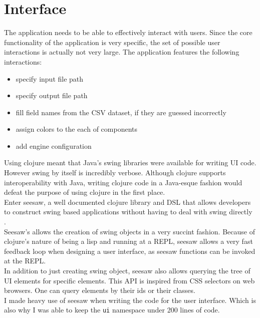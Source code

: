 \section{Interface}


The application needs to be able to effectively interact with users. Since the core functionality of the application is very specific, the set of possible user interactions is actually not very large. The application features the following interactions:

\begin{itemize}
\item specify input file path
\item specify output file path
\item fill field names from the CSV dataset, if they are guessed incorrectly
\item assign colors to the each of components
\item add engine configuration
\end{itemize}

Using clojure meant that Java's swing libraries were available for writing UI code. However swing by itself is incredibly verbose. Although clojure supports interoperability with Java, writing clojure code in a Java-esque fashion would defeat the purpose of using clojure in the first place. \\

Enter seesaw, a well documented clojure library and DSL that allows developers to construct swing based applications without having to deal with swing directly \citep{clj:seesaw}.\\

Seesaw's allows the creation of swing objects in a very succint fashion. Because of clojure's nature of being a lisp and running at a REPL, seesaw allows a very fast feedback loop when designing a user interface, as seesaw functions can be invoked at the REPL.\\

In addition to just creating swing object, seesaw also allows querying the tree of UI elements for specific elements. This API is inspired from CSS selectors on web browsers. One can query elements by their ids or their classes. \\

I made heavy use of seesaw when writing the code for the user interface. Which is also why I was able to keep the \lstinline{ui} namespace under 200 lines of code.\\


